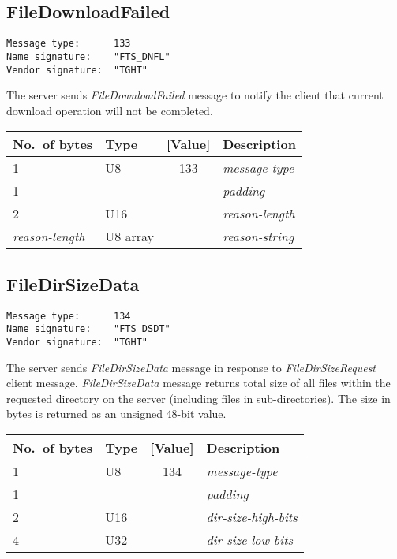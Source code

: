 \documentclass[a4paper]{article}
\newcommand{\typestr}[1]{\textit{#1}}
\begin{document}

\newpage
\subsection{FileDownloadFailed}
\begin{verbatim}
Message type:      133
Name signature:    "FTS_DNFL"
Vendor signature:  "TGHT"
\end{verbatim}

The server sends \typestr{FileDownloadFailed} message to notify the
client that current download operation will not be completed.

\begin{tabular}{l|lc|l} \hline
No.\ of bytes & Type & [Value] & Description \\ \hline
1 & U8  & 133 & \typestr{message-type} \\
1 &     &     & \typestr{padding} \\
2 & U16 &     & \typestr{reason-length} \\
\typestr{reason-length} & U8 array & & \typestr{reason-string} \\
\hline\end{tabular}


\newpage
\subsection{FileDirSizeData}
\begin{verbatim}
Message type:      134
Name signature:    "FTS_DSDT"
Vendor signature:  "TGHT"
\end{verbatim}

The server sends \typestr{FileDirSizeData} message in response to
\typestr{FileDirSizeRequest} client message. \typestr{FileDirSizeData}
message returns total size of all files within the requested directory
on the server (including files in sub-directories). The size in bytes
is returned as an unsigned 48-bit value.

\begin{tabular}{l|lc|l} \hline
No.\ of bytes & Type & [Value] & Description \\ \hline
1 & U8  & 134 & \typestr{message-type} \\
1 &     &     & \typestr{padding} \\
2 & U16 &     & \typestr{dir-size-high-bits} \\
4 & U32 &     & \typestr{dir-size-low-bits} \\
\hline\end{tabular}
\end{document}
